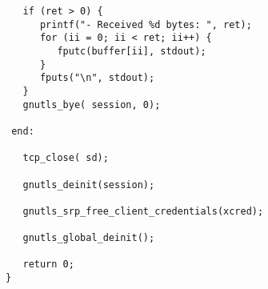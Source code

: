\begin{verbatim}
   if (ret > 0) {
      printf("- Received %d bytes: ", ret);
      for (ii = 0; ii < ret; ii++) {
         fputc(buffer[ii], stdout);
      }
      fputs("\n", stdout);
   }
   gnutls_bye( session, 0);

 end:

   tcp_close( sd);

   gnutls_deinit(session);

   gnutls_srp_free_client_credentials(xcred);

   gnutls_global_deinit();

   return 0;
}

\end{verbatim}

